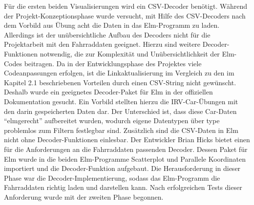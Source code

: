 \documentclass[usegeometry=true]{scrartcl}
\begin{document}
Für die ersten beiden Visualisierungen wird ein CSV-Decoder benötigt. Während der Projekt-Konzeptionsphase wurde versucht, mit Hilfe des CSV-Decoders nach dem Vorbild aus Übung acht die Daten in das Elm-Programm zu laden. Allerdings ist der unübersichtliche Aufbau des Decoders nicht für die Projektarbeit mit den Fahrraddaten geeignet. Hierzu sind weitere Decoder-Funktionen notwendig, die zur Komplexität und Unübersichtlichkeit der Elm-Codes beitragen.
Da in der Entwicklungsphase des Projektes viele Codeanpassungen erfolgen, ist die Linkaktualisierung im Vergleich zu den im Kapitel 2.1 beschriebenen Vorteilen durch einen CSV-String nicht gewünscht. Deshalb wurde ein geeignetes Decoder-Paket für Elm in der offiziellen Dokumentation gesucht.
Ein Vorbild stellten hierzu die IRV-Car-Übungen mit den darin gespeicherten Daten dar. Der Unterschied ist, dass diese Car-Daten "`elmgerecht"' aufbereitet wurden, wodurch eigene Datentypen über type problemlos zum Filtern festlegbar sind. Zusätzlich sind die CSV-Daten in Elm nicht ohne Decoder-Funktionen einlesbar. Der Entwickler Brian Hicks bietet einen für die Anforderungen an die Fahrraddaten passenden Decoder. Dessen Paket für Elm wurde in die beiden Elm-Programme Scatterplot und Parallele Koordinaten importiert und die Decoder-Funktion aufgebaut. 
Die Herausforderung in dieser Phase war die Decoder-Implementierung, sodass das Elm-Programm die Fahrraddaten richtig laden und darstellen kann. Nach erfolgreichen Tests dieser Anforderung wurde mit der zweiten Phase begonnen.
\end{document}
